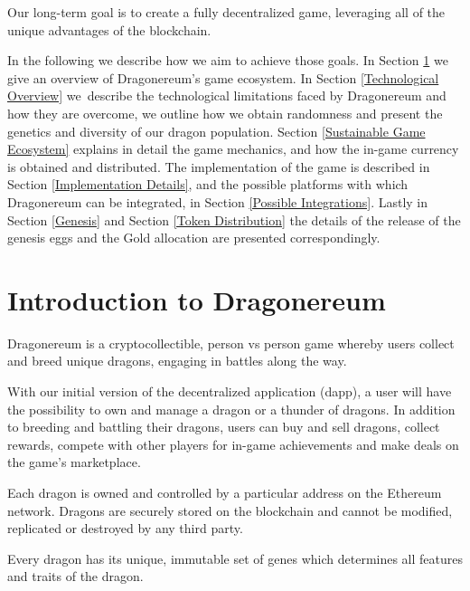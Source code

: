 \documentclass[12pt]{article}
\begin{document}
Our long-term goal is to create a fully decentralized game, leveraging all of the unique advantages of the blockchain.\par

In the following we describe how we aim to achieve those goals. In Section \ref{Introduction to Dragonereum} we give an overview of Dragonereum’s game ecosystem. In Section \ref{Technological Overview} we\ describe the technological limitations faced by Dragonereum and how they are overcome, we outline how we obtain randomness and present the genetics and diversity of our dragon population.  Section \ref{Sustainable Game Ecosystem} explains in detail the game mechanics, and how the in-game currency is obtained and distributed. The implementation of the game is described in Section \ref{Implementation Details}, and the possible platforms with which Dragonereum can be integrated, in Section \ref{Possible Integrations}. Lastly in Section \ref{Genesis} and Section \ref{Token Distribution} the details of the release of the genesis eggs and the Gold allocation are presented correspondingly.\par


\newpage
\vspace{\baselineskip}\section{Introduction to Dragonereum}
  \label{Introduction to Dragonereum}  \par

Dragonereum is a cryptocollectible, person vs person game whereby users collect and breed unique dragons, engaging in battles along the way.\par

With our initial version of the decentralized application (dapp), a user will have the possibility to own and manage a dragon or a thunder of dragons. In addition to breeding and battling their dragons, users can buy and sell dragons, collect rewards, compete with other players for in-game achievements and make deals on the game’s marketplace.\par

Each dragon is owned and controlled by a particular address on the Ethereum network. Dragons are securely stored on the blockchain and cannot be modified, replicated or destroyed by any third party.\par

Every dragon has its unique, immutable set of genes which determines all features and traits of the dragon.\par
\end{document}

